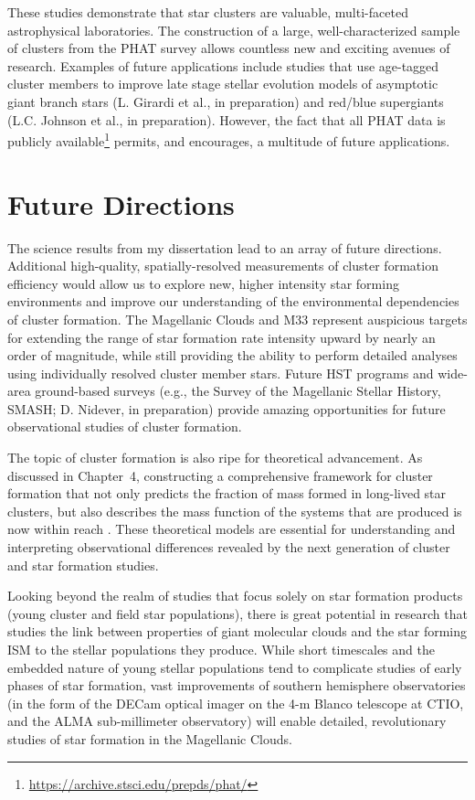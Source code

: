 These studies demonstrate that star clusters are valuable, multi-faceted astrophysical laboratories.  The construction of a large, well-characterized sample of clusters from the PHAT survey allows countless new and exciting avenues of research.  Examples of future applications include studies that use age-tagged cluster members to improve late stage stellar evolution models of asymptotic giant branch stars (L. Girardi et al., in preparation) and red/blue supergiants (L.C. Johnson et al., in preparation).  However, the fact that all PHAT data is publicly available\footnote{\url{https://archive.stsci.edu/prepds/phat/}} permits, and encourages, a multitude of future applications.

\section{Future Directions}

The science results from my dissertation lead to an array of future directions.  Additional high-quality, spatially-resolved measurements of cluster formation efficiency would allow us to explore new, higher intensity star forming environments and improve our understanding of the environmental dependencies of cluster formation.  The Magellanic Clouds and M33 represent auspicious targets for extending the range of star formation rate intensity upward by nearly an order of magnitude, while still providing the ability to perform detailed analyses using individually resolved cluster member stars.  Future HST programs and wide-area ground-based surveys (e.g., the Survey of the Magellanic Stellar History, SMASH; D. Nidever, in preparation) provide amazing opportunities for future observational studies of cluster formation.

The topic of cluster formation is also ripe for theoretical advancement.  As discussed in Chapter~4, constructing a comprehensive framework for cluster formation that not only predicts the fraction of mass formed in long-lived star clusters, but also describes the mass function of the systems that are produced is now within reach \citep{Krumholz14_review}.  These theoretical models are essential for understanding and interpreting observational differences revealed by the next generation of cluster and star formation studies.

Looking beyond the realm of studies that focus solely on star formation products (young cluster and field star populations), there is great potential in research that studies the link between properties of giant molecular clouds and the star forming ISM to the stellar populations they produce.  While short timescales and the embedded nature of young stellar populations tend to complicate studies of early phases of star formation, vast improvements of southern hemisphere observatories (in the form of the DECam optical imager on the 4-m Blanco telescope at CTIO, and the ALMA sub-millimeter observatory) will enable detailed, revolutionary studies of star formation in the Magellanic Clouds.

